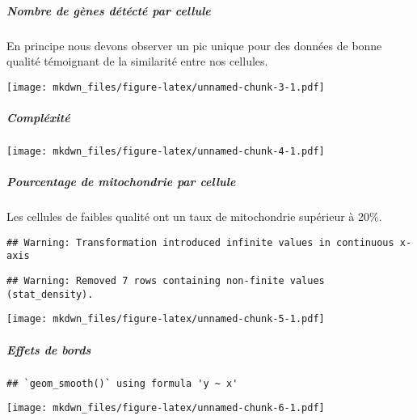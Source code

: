 \documentclass[
]{article}
\begin{document}
\hypertarget{nombre-de-guxe8nes-duxe9tuxe9ctuxe9-par-cellule}{%
\subparagraph{Nombre de gènes détécté par
cellule}\label{nombre-de-guxe8nes-duxe9tuxe9ctuxe9-par-cellule}}

En principe nous devons observer un pic unique pour des données de bonne
qualité témoignant de la similarité entre nos cellules.

\texttt{[image: mkdwn\_files/figure-latex/unnamed-chunk-3-1.pdf]}

\hypertarget{compluxe9xituxe9}{%
\subparagraph{Compléxité}\label{compluxe9xituxe9}}

\texttt{[image: mkdwn\_files/figure-latex/unnamed-chunk-4-1.pdf]}

\hypertarget{pourcentage-de-mitochondrie-par-cellule}{%
\subparagraph{Pourcentage de mitochondrie par
cellule}\label{pourcentage-de-mitochondrie-par-cellule}}

Les cellules de faibles qualité ont un taux de mitochondrie supérieur à
20\%.

\begin{verbatim}
## Warning: Transformation introduced infinite values in continuous x-axis
\end{verbatim}

\begin{verbatim}
## Warning: Removed 7 rows containing non-finite values (stat_density).
\end{verbatim}

\texttt{[image: mkdwn\_files/figure-latex/unnamed-chunk-5-1.pdf]}

\hypertarget{effets-de-bords}{%
\subparagraph{Effets de bords}\label{effets-de-bords}}

\begin{verbatim}
## `geom_smooth()` using formula 'y ~ x'
\end{verbatim}

\texttt{[image: mkdwn\_files/figure-latex/unnamed-chunk-6-1.pdf]}
\end{document}

